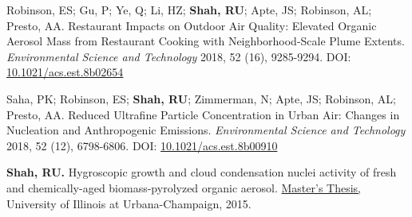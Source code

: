 \documentclass{article}
\begin{document}
\begin{etaremune}
\item Robinson, ES; Gu, P; Ye, Q; Li, HZ; \textbf{Shah, RU}; Apte, JS; Robinson, AL; Presto, AA. Restaurant Impacts on Outdoor Air Quality: Elevated Organic Aerosol Mass from Restaurant Cooking with Neighborhood-Scale Plume Extents. \textit{Environmental Science and Technology} 2018, 52 (16), 9285-9294. DOI: \href{http://pubs.acs.org/doi/10.1021/acs.est.8b02654}{10.1021/acs.est.8b02654}
\item Saha, PK; Robinson, ES; \textbf{Shah, RU}; Zimmerman, N; Apte, JS; Robinson, AL; Presto, AA. Reduced Ultrafine Particle Concentration in Urban Air: Changes in Nucleation and Anthropogenic Emissions. \textit{Environmental Science and Technology} 2018, 52 (12), 6798-6806. DOI: \href{http://pubs.acs.org/doi/10.1021/acs.est.8b00910}{10.1021/acs.est.8b00910}
\item \textbf{Shah, RU.} Hygroscopic growth and cloud condensation nuclei activity of fresh and chemically-aged biomass-pyrolyzed organic aerosol. \href{https://www.ideals.illinois.edu/handle/2142/88130}{Master's Thesis,} University of Illinois at Urbana-Champaign, 2015.
\end{etaremune}

\end{document}
